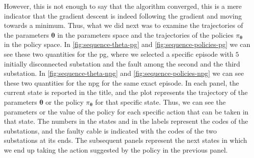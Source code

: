 However, this is not enough to say that the algorithm converged, this is a mere indicator that the gradient descent is indeed following the gradient and moving towards a minimum. Thus, what we did next was to examine the trajectories of the parameters $\boldsymbol \theta$ in the parameters space and the trajectories of the policies $\pi_{\boldsymbol \theta}$ in the policy space. In \autoref{fig:sequence-theta-pg} and \autoref{fig:sequence-policies-pg} we can see these two quantities for the \acrshort{pg}, where we selected a specific episode with $5$ initially disconnected substation and the fault among the second and the third substation. In \autoref{fig:sequence-theta-npg} and \autoref{fig:sequence-policies-npg} we can see these two quantities for the \acrshort{npg} for the same exact episode. In each panel, the current state is reported in the title, and the plot represents the trajectory of the parameters $\boldsymbol \theta$ or the policy $\pi_{\boldsymbol \theta}$ for that specific state. Thus, we can see the parameters or the value of the policy for each specific action that can be taken in that state. The numbers in the states and in the labels represent the codes of the substations, and the faulty cable is indicated with the codes of the two substations at its ends. The subsequent panels represent the next states in which we end up taking the action suggested by the policy in the previous panel.

